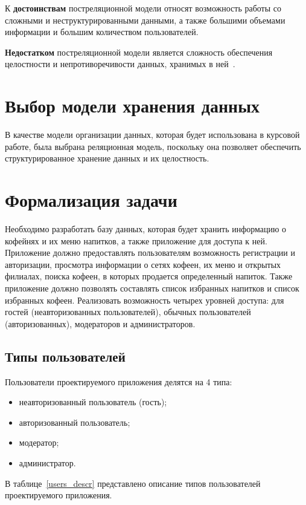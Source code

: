 К \textbf{достоинствам} постреляционной модели относят возможность работы со сложными и неструктурированными данными, а также большими объемами информации и большим количеством пользователей.

\textbf{Недостатком} постреляционной модели является сложность обеспечения целостности и непротиворечивости данных, хранимых в ней~\cite{markin}.


\section{Выбор модели хранения данных}
В качестве модели организации данных, которая будет использована в курсовой работе, была выбрана реляционная модель, поскольку она позволяет обеспечить структурированное хранение данных и их целостность.

\section{Формализация задачи}
Необходимо разработать базу данных, которая будет хранить информацию о кофейнях и их меню напитков, а также приложение для доступа к ней. Приложение должно предоставлять пользователям возможность регистрации и авторизации, просмотра информации о сетях кофеен, их меню и открытых филиалах, поиска кофеен, в которых продается определенный напиток. Также приложение должно позволять составлять список избранных напитков и список избранных кофеен. Реализовать возможность четырех уровней доступа: для гостей (неавторизованных пользователей), обычных пользователей (авторизованных), модераторов и администраторов.




\subsection{Типы пользователей}

Пользователи проектируемого приложения делятся на 4 типа:
\begin{itemize}
	\item неавторизованный пользователь (гость);
	\item авторизованный пользователь;
	\item модератор;
	\item администратор.
\end{itemize} 

В таблице~\ref{users_descr} представлено описание типов пользователей проектируемого приложения.

